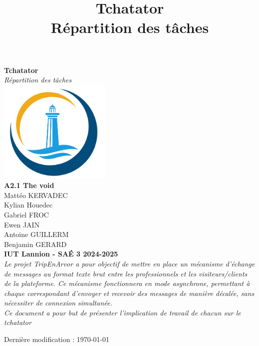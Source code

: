 \documentclass{report}
\title{\Huge Tchatator \\ {\LARGE Répartition des tâches}}
\begin{document}
\begin{titlepage}
    \begin{center}
        {\Huge\bfseries Tchatator} \\[1cm]
        {\Large\textit{Répartition des tâches}} \\[2cm]

        \includegraphics[width=0.4\textwidth]{../../../html/img/logo.png} \\[2cm]

        {\Large \textbf{A2.1 The void}} \\ [.2cm]
        {\large Mattéo KERVADEC } \\[.2cm]
        {\large Kylian Houedec } \\[.2cm]
        {\large Gabriel FROC } \\[.2cm]
        {\large Ewen JAIN } \\[.2cm]
        {\large Antoine GUILLERM } \\[.2cm]
        {\large Benjamin GERARD } \\[1cm]

        \textbf{IUT Lannion - SAÉ 3 2024-2025} \\[1.2cm]

        \textit{
        Le projet TripEnArvor a pour objectif de mettre en place un mécanisme d’échange de messages au format texte brut entre les professionnels et les visiteurs/clients de la plateforme. Ce mécanisme fonctionnera en mode asynchrone, permettant à chaque correspondant d’envoyer et recevoir des messages de manière décalée, sans nécessiter de connexion simultanée. 
		} \\[0.5cm]
		
		\textit{
        Ce document a pour but de présenter l'implication de travail de chacun sur le tchatator
		}

        \vfill  %

        {\small Dernière modification : \today}
    \end{center}
\end{titlepage}
\end{document}

